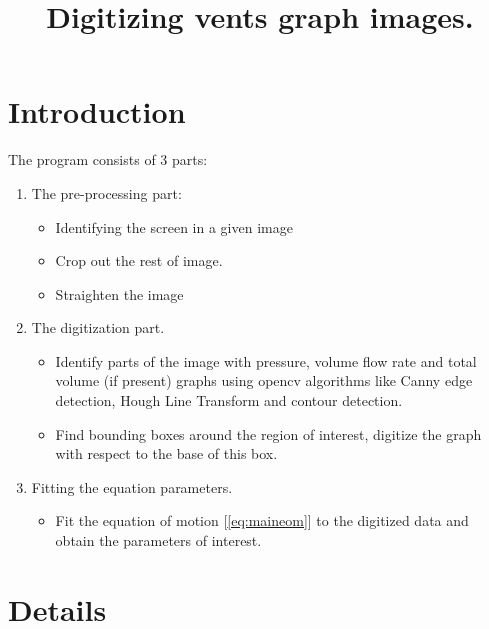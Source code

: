 

\title{Digitizing vents graph images.}
\author{}


	\maketitle
	
	\tableofcontents
	
	\section{Introduction}
	
	The program consists of 3 parts:
	\begin{enumerate}
		\item
		The pre-processing part:
		\begin{itemize}
			\item
			Identifying the screen in a given image
			
			\item
			Crop out the rest of image.
			
			\item
			Straighten the image
		\end{itemize}
	
		\item
		The digitization part.
		\begin{itemize}
			\item
			Identify parts of the image with pressure, volume flow rate and total volume (if present) graphs using opencv algorithms like Canny edge detection, Hough Line Transform and contour detection.
			
			\item
			Find bounding boxes around the region of interest, digitize the graph with respect to the base of this box.
		\end{itemize}
		
		\item
		Fitting the equation parameters.
		\begin{itemize}
			\item
			Fit the equation of motion [\autoref{eq:maineom}] to the digitized data and obtain the parameters of interest.			
		\end{itemize}
		 
	\end{enumerate}
	
	\section{Details}
	
